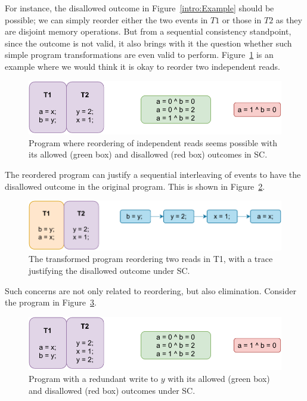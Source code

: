     For instance, the disallowed outcome in Figure~\ref{intro:Example} should be possible; we can simply reorder either the two events in $T1$ or those in $T2$ as they are disjoint memory operations. 
    But from a sequential consistency standpoint, since the outcome is not valid, it also brings with it the question whether such simple program transformations are even valid to perform.
    Figure~\ref{intro:Example2(a)} is an example where we would think it is okay to reorder two independent reads. 
    \begin{figure}[H]
        \centering
        \includegraphics[scale=0.7]{2.Background/SC_Reordering(a).pdf}
        \caption{Program where reordering of independent reads seems possible with its allowed (green box) and disallowed (red box) outcomes in SC.}
        \label{intro:Example2(a)}
    \end{figure}

    The reordered program can justify a sequential interleaving of events to have the disallowed outcome in the original program. 
    This is shown in Figure~\ref{intro:Example2(b)}.
    \begin{figure}[H]
        \centering
        \includegraphics[scale=0.7]{2.Background/SC_Reordering(b).pdf}
        \caption{The transformed program reordering two reads in T1, with a trace justifying the disallowed outcome under SC.}
        \label{intro:Example2(b)}
    \end{figure}

    Such concerns are not only related to reordering, but also elimination. 
    Consider the program in Figure~\ref{intro:Example3(a)}.
    \begin{figure}[H]
        \centering
        \includegraphics[scale=0.7]{2.Background/SC_Example2(a).pdf}
        \caption{Program with a redundant write to $y$ with its allowed (green box) and disallowed (red box) outcomes under SC.}
        \label{intro:Example3(a)}
    \end{figure}

